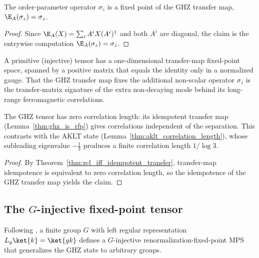 \begin{lemma}\label{thm:ghz_order_param}
    \leanok
    The order-parameter operator $\sigma_z$ is a fixed point of the GHZ transfer
    map, $\E_A(\sigma_z) = \sigma_z$.
\end{lemma}

\begin{proof}
    \leanok
    Since $\E_A(X) = \sum_i A^i X (A^i)^{\dagger}$ and both $A^i$ are diagonal,
    the claim is the entrywise computation $\E_A(\sigma_z) = \sigma_z$.
\end{proof}

\begin{remark}
    A primitive (injective) tensor has a one-dimensional transfer-map
    fixed-point space, spanned by a positive matrix that equals the identity only
    in a normalized gauge. That the GHZ transfer map fixes the additional
    non-scalar operator $\sigma_z$ is the transfer-matrix signature of the extra
    non-decaying mode behind its long-range ferromagnetic correlations.
\end{remark}

\begin{lemma}\label{thm:ghz_zcl}
    \leanok
    The GHZ tensor has zero correlation length: its idempotent transfer map
    (Lemma~\ref{thm:ghz_is_rfp}) gives correlations independent of the
    separation. This contrasts with the AKLT state
    (Lemma~\ref{thm:aklt_correlation_length}), whose subleading eigenvalue
    $-\tfrac13$ produces a finite correlation length $1/\log 3$.
\end{lemma}

\begin{proof}
    \leanok
    By Theorem~\ref{thm:zcl_iff_idempotent_transfer}, transfer-map idempotence
    is equivalent to zero correlation length, so the idempotence of the GHZ
    transfer map yields the claim.
\end{proof}


\subsection{The $G$-injective fixed-point tensor}

Following \cite[Section~III.A, ``Virtual symmetries'']{Cirac2021Matrix}, a
finite group $G$ with left regular representation $L_g\ket{k}=\ket{gk}$
defines a $G$-injective renormalization-fixed-point MPS that generalizes the
GHZ state to arbitrary groups.

